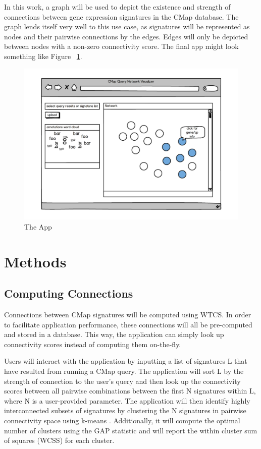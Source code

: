 \documentclass[12pt]{article}
\begin{document}
In this work, a graph will be used to depict the existence and strength of connections between gene expression signatures in the CMap database. The graph lends itself very well to this use case, as signatures will be represented as nodes and their pairwise connections by the edges. Edges will only be depicted between nodes with a non-zero connectivity score. The final app might look something like Figure ~\ref{fig:app_mockup}.
\begin{figure}[h]
\centering
\includegraphics[scale=0.5]{img/app_mockup}
\caption{The App}
\label{fig:app_mockup}
\end{figure}

\section{Methods}
\subsection{Computing Connections}

Connections between CMap signatures will be computed using WTCS. In order to facilitate application performance, these connections will all be pre-computed and stored in a database. This way, the application can simply look up connectivity scores instead of computing them on-the-fly.

Users will interact with the application by inputting a list of signatures L that have resulted from running a CMap query. The application will sort L by the strength of connection to the user's query and then look up the connectivity scores between all pairwise combinations between the first N signatures within L, where N is a user-provided parameter. The application will then identify highly interconnected subsets of signatures by clustering the N signatures in pairwise connectivity space using k-means \cite{lloyd_least_squares_1982}. Additionally, it will compute the optimal number of clusters using the GAP statistic and will report the within cluster sum of squares (WCSS) for each cluster.
\end{document}
